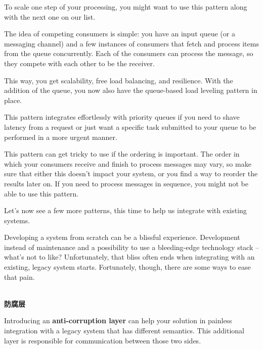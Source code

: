 To scale one step of your processing, you might want to use this pattern along with the next one on our list.


The idea of competing consumers is simple: you have an input queue (or a messaging channel) and a few instances of consumers that fetch and process items from the queue concurrently. Each of the consumers can process the message, so they compete with each other to be the receiver.

This way, you get scalability, free load balancing, and resilience. With the addition of the queue, you now also have the queue-based load leveling pattern in place.

This pattern integrates effortlessly with priority queues if you need to shave latency from a request or just want a specific task submitted to your queue to be performed in a more urgent manner.

\begin{tcolorbox}[colback=blue!5!white,colframe=blue!75!black, title=Note]
\hspace*{0.7cm}This pattern can get tricky to use if the ordering is important. The order in which your consumers receive and finish to process messages may vary, so make sure that either this doesn't impact your system, or you find a way to reorder the results later on. If you need to process messages in sequence, you might not be able to use this pattern.
\end{tcolorbox}

Let's now see a few more patterns, this time to help us integrate with existing systems.


Developing a system from scratch can be a blissful experience. Development instead of maintenance and a possibility to use a bleeding-edge technology stack – what's not to like? Unfortunately, that bliss often ends when integrating with an existing, legacy system starts. Fortunately, though, there are some ways to ease that pain.

\hspace*{\fill} \\ %
\noindent
\textbf{防腐层}

Introducing an \textbf{anti-corruption layer} can help your solution in painless integration with a legacy system that has different semantics. This additional layer is responsible for communication between those two sides.

